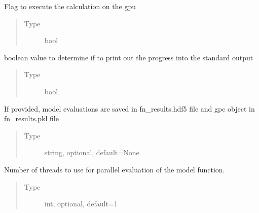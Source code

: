 \documentclass[letterpaper,10pt,english,openany,oneside]{sphinxmanual}
\begin{document}
\begin{fulllineitems}

\begin{fulllineitems}
\label{\detokenize{pygpc:pygpc.GPC.GPC.gpu}}
Flag to execute the calculation on the gpu
\begin{quote}\begin{description}
\item[{Type}] \leavevmode
bool

\end{description}\end{quote}

\end{fulllineitems}


\begin{fulllineitems}
\label{\detokenize{pygpc:pygpc.GPC.GPC.verbose}}
boolean value to determine if to print out the progress into the standard output
\begin{quote}\begin{description}
\item[{Type}] \leavevmode
bool

\end{description}\end{quote}

\end{fulllineitems}


\begin{fulllineitems}
\label{\detokenize{pygpc:pygpc.GPC.GPC.fn_results}}
If provided, model evaluations are saved in fn\_results.hdf5 file and gpc object in fn\_results.pkl file
\begin{quote}\begin{description}
\item[{Type}] \leavevmode
string, optional, default=None

\end{description}\end{quote}

\end{fulllineitems}


\begin{fulllineitems}
\label{\detokenize{pygpc:pygpc.GPC.GPC.n_cpu}}
Number of threads to use for parallel evaluation of the model function.
\begin{quote}\begin{description}
\item[{Type}] \leavevmode
int, optional, default=1


\end{description}
\end{quote}
\end{fulllineitems}
\end{fulllineitems}
\end{document}
